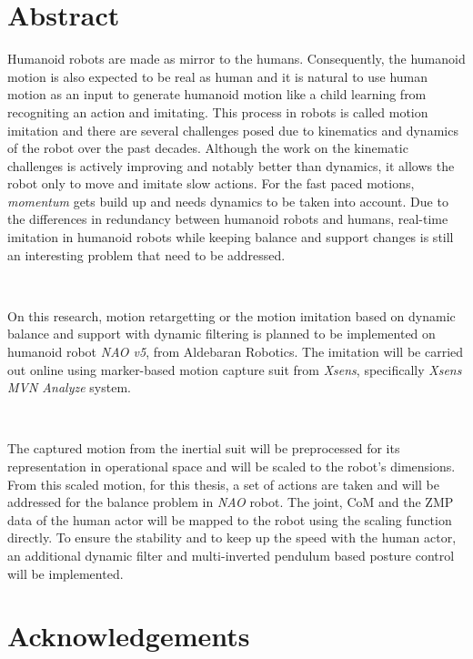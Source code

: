 \documentclass{thesisreport}
\begin{document}
   
 
  \section*{Abstract}
   
  Humanoid robots are made as mirror to the humans. Consequently, the humanoid motion is also expected to be real as 
  human and it is natural to use human motion as an input to generate humanoid motion like a child learning from recogniting
  an action and imitating. This process in robots is called motion imitation and there are several challenges posed 
  due to kinematics and dynamics of the robot over the past decades. Although the work on the kinematic challenges is 
  actively improving and notably better than dynamics, it allows the robot only to move and imitate slow actions. 
  For the fast paced motions, \textit{momentum} gets build up and needs dynamics to be taken into account. Due to the 
  differences in redundancy between humanoid robots and humans, real-time imitation in humanoid robots while keeping 
  balance and support changes is still an interesting problem that need to be addressed.

  ~
  
  On this research, motion retargetting or the motion imitation based on dynamic balance and support with dynamic filtering 
  is planned to be implemented on humanoid robot \textit{NAO v5}, from Aldebaran Robotics. The imitation will be carried out 
  online using marker-based motion capture suit from \textit{Xsens}, specifically \textit{Xsens MVN Analyze} system.
  
  ~
  
  The captured motion from the inertial suit will be preprocessed for its representation in operational space and will be 
  scaled to the robot's dimensions. From this scaled motion, for this thesis, a set of actions are taken and will be addressed
  for the balance problem in \textit{NAO} robot. The joint, CoM and the ZMP data of the human actor will be mapped to the robot
  using the scaling function directly. To ensure the stability and to keep up the speed with the human actor, an additional 
  dynamic filter and multi-inverted pendulum based posture control will be implemented. 
 
 \newpage
 
 \section*{Acknowledgements}
 
\end{document}
